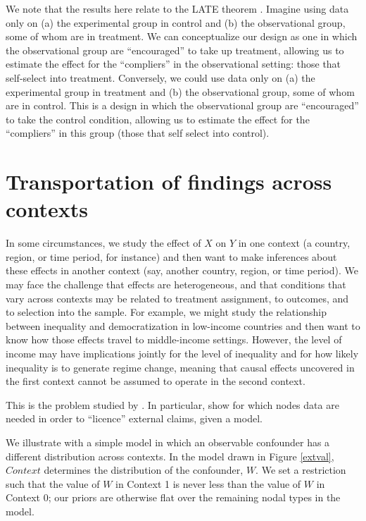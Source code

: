 \documentclass[
  12pt,
]{book}
\begin{document}
We note that the results here relate to the LATE theorem \citep{angrist1995identification}. Imagine using data only on (a) the experimental group in control and (b) the observational group, some of whom are in treatment. We can conceptualize our design as one in which the observational group are ``encouraged'' to take up treatment, allowing us to estimate the effect for the ``compliers'' in the observational setting: those that self-select into treatment. Conversely, we could use data only on (a) the experimental group in treatment and (b) the observational group, some of whom are in control. This is a design in which the observational group are ``encouraged'' to take the control condition, allowing us to estimate the effect for the ``compliers'' in this group (those that self select into control).

\hypertarget{transportation-of-findings-across-contexts}{%
\section{Transportation of findings across contexts}\label{transportation-of-findings-across-contexts}}

In some circumstances, we study the effect of \(X\) on \(Y\) in one context (a country, region, or time period, for instance) and then want to make inferences about these effects in another context (say, another country, region, or time period). We may face the challenge that effects are heterogeneous, and that conditions that vary across contexts may be related to treatment assignment, to outcomes, and to selection into the sample. For example, we might study the relationship between inequality and democratization in low-income countries and then want to know how those effects travel to middle-income settings. However, the level of income may have implications jointly for the level of inequality and for how likely inequality is to generate regime change, meaning that causal effects uncovered in the first context cannot be assumed to operate in the second context.

This is the problem studied by \citet{pearl2014external}. In particular, \citet{pearl2014external} show for which nodes data are needed in order to ``licence'' external claims, given a model.

We illustrate with a simple model in which an observable confounder has a different distribution across contexts. In the model drawn in Figure \ref{extval}, \(Context\) determines the distribution of the confounder, \(W\). We set a restriction such that the value of \(W\) in Context 1 is never less than the value of \(W\) in Context 0; our priors are otherwise flat over the remaining nodal types in the model.
\end{document}
